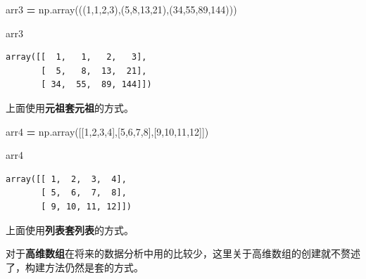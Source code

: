 \documentclass[]{article}
\newenvironment{Shaded}{\begin{snugshade}}{\end{snugshade}}
\newcommand{\DecValTok}[1]{\textcolor[rgb]{0.00,0.00,0.81}{#1}}
\newcommand{\OperatorTok}[1]{\textcolor[rgb]{0.81,0.36,0.00}{\textbf{#1}}}
\newcommand{\NormalTok}[1]{#1}
\begin{document}
\begin{Shaded}
\begin{Highlighting}[]
\NormalTok{arr3 }\OperatorTok{=}\NormalTok{ np.array(((}\DecValTok{1}\NormalTok{,}\DecValTok{1}\NormalTok{,}\DecValTok{2}\NormalTok{,}\DecValTok{3}\NormalTok{),(}\DecValTok{5}\NormalTok{,}\DecValTok{8}\NormalTok{,}\DecValTok{13}\NormalTok{,}\DecValTok{21}\NormalTok{),(}\DecValTok{34}\NormalTok{,}\DecValTok{55}\NormalTok{,}\DecValTok{89}\NormalTok{,}\DecValTok{144}\NormalTok{)))}
\end{Highlighting}
\end{Shaded}

\begin{Shaded}
\begin{Highlighting}[]
\NormalTok{arr3}
\end{Highlighting}
\end{Shaded}

\begin{verbatim}
array([[  1,   1,   2,   3],
       [  5,   8,  13,  21],
       [ 34,  55,  89, 144]])
\end{verbatim}

上面使用\textbf{元祖套元祖}的方式。

\begin{Shaded}
\begin{Highlighting}[]
\NormalTok{arr4 }\OperatorTok{=}\NormalTok{ np.array([[}\DecValTok{1}\NormalTok{,}\DecValTok{2}\NormalTok{,}\DecValTok{3}\NormalTok{,}\DecValTok{4}\NormalTok{],[}\DecValTok{5}\NormalTok{,}\DecValTok{6}\NormalTok{,}\DecValTok{7}\NormalTok{,}\DecValTok{8}\NormalTok{],[}\DecValTok{9}\NormalTok{,}\DecValTok{10}\NormalTok{,}\DecValTok{11}\NormalTok{,}\DecValTok{12}\NormalTok{]])}
\end{Highlighting}
\end{Shaded}

\begin{Shaded}
\begin{Highlighting}[]
\NormalTok{arr4}
\end{Highlighting}
\end{Shaded}

\begin{verbatim}
array([[ 1,  2,  3,  4],
       [ 5,  6,  7,  8],
       [ 9, 10, 11, 12]])
\end{verbatim}

上面使用\textbf{列表套列表}的方式。

对于\textbf{高维数组}在将来的数据分析中用的比较少，这里关于高维数组的创建就不赘述了，构建方法仍然是套的方式。
\end{document}
